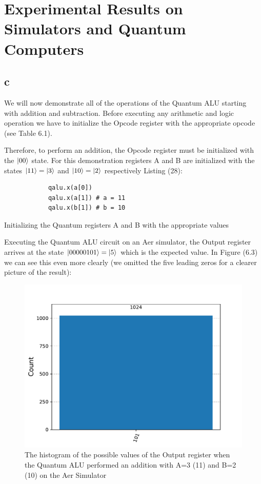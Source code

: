 \newpage
\section{Experimental Results on Simulators and Quantum Computers}
\subsection{c}

We will now demonstrate all of the operations of the Quantum ALU starting with addition and subtraction. Before executing any arithmetic and logic 
operation we have to initialize the Opcode register with the appropriate opcode (see Table 6.1).

Therefore, to perform an addition, the Opcode register must be initialized with the $\ket{00}$ state. For this demonstration
registers A and B are initialized with the states $\ket{11}=\ket{3}$ and $\ket{10}=\ket{2}$ respectively Listing (28):

\begin{listing}[!ht]
        \begin{verbatim}
            qalu.x(a[0])
            qalu.x(a[1]) # a = 11
            qalu.x(b[1]) # b = 10
        \end{verbatim}
        \caption{Initializing the Quantum registers A and B with the appropriate values}
        \label{ls:6_init_add}
\end{listing}

Executing the Quantum ALU circuit on an Aer simulator, the Output register arrives at the state $\ket{00000101}=\ket{5}$ which is the expected value.
In Figure (6.3) we can see this even more clearly (we omitted the five leading zeros for a clearer picture of the result):

\begin{figure}[!ht]
        \centering
        \includegraphics[scale=0.7]{images/6_Complete_System/adder_subtractor_aer_result.pdf}
        \caption{The histogram of the possible values of the Output register when the Quantum ALU performed an addition with A=3 (11) and B=2 (10) on the Aer Simulator}
\end{figure}

